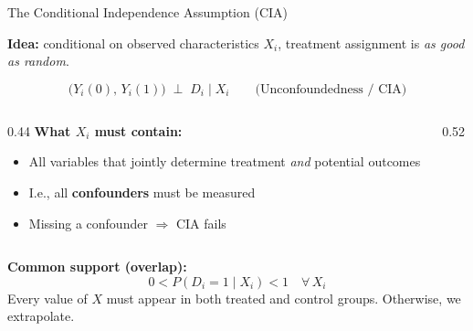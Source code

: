 \documentclass[aspectratio=169, 10pt]{beamer}
\begin{document}
\begin{frame}{The Conditional Independence Assumption (CIA)}

  \textbf{Idea:} conditional on observed characteristics $X_i$, treatment assignment is \emph{as good as random}.

  \[
    \bigl(Y_i(0),\, Y_i(1)\bigr) \;\perp\; D_i \;\Big|\; X_i
    \qquad \text{(Unconfoundedness / CIA)}
  \]

  \medskip
  \begin{columns}[T]
    \begin{column}{0.44\textwidth}
      \textbf{What $X_i$ must contain:}
      \begin{itemize}
        \item All variables that jointly determine treatment \emph{and} potential outcomes
        \item I.e., all \textbf{confounders} must be measured
        \item Missing a confounder $\Rightarrow$ CIA fails
      \end{itemize}
    \end{column}
    \begin{column}{0.52\textwidth}
      \begin{center}
      \end{center}
    \end{column}
  \end{columns}

  \bigskip
  \textbf{Common support (overlap):}
  \[
    0 < P(D_i=1 \mid X_i) < 1 \quad \forall\, X_i
  \]
  Every value of $X$ must appear in both treated and control groups. Otherwise, we extrapolate.
\end{frame}


\end{document}
